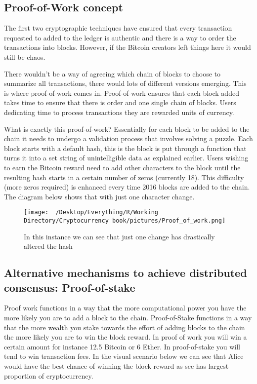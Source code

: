 \documentclass[]{book}
\theoremstyle{definition}
\theoremstyle{definition}
\theoremstyle{definition}
\theoremstyle{remark}
\begin{document}
\subsection{Proof-of-Work concept}\label{proof-of-work-concept}

The first two cryptographic techniques have ensured that every
transaction requested to added to the ledger is authentic and there is a
way to order the transactions into blocks. However, if the Bitcoin
creators left things here it would still be chaos.

There wouldn't be a way of agreeing which chain of blocks to choose to
summarize all transactions, there would lots of different versions
emerging. This is where proof-of-work comes in. Proof-of-work ensures
that each block added takes time to ensure that there is order and one
single chain of blocks. Users dedicating time to process transactions
they are rewarded units of currency.

What is exactly this proof-of-work? Essentially for each block to be
added to the chain it needs to undergo a validation process that
involves solving a puzzle. Each block starts with a default hash, this
is the block is put through a function that turns it into a set string
of unintelligible data as explained earlier. Users wishing to earn the
Bitcoin reward need to add other characters to the block until the
resulting hash starts in a certain number of zeros (currently 18). This
difficulty (more zeros required) is enhanced every time 2016 blocks are
added to the chain. The diagram below shows that with just one character
change.

\begin{figure}[htbp]
\centering
\texttt{[image: ~/Desktop/Everything/R/Working Directory/Cryptocurrency book/pictures/Proof\_of\_work.png]}
\caption{In this instance we can see that just one change has
drastically altered the hash}
\end{figure}

\subsection{Alternative mechanisms to achieve distributed consensus:
Proof-of-stake}\label{alternative-mechanisms-to-achieve-distributed-consensus-proof-of-stake}

Proof work functions in a way that the more computational power you have
the more likely you are to add a block to the chain. Proof-of-Stake
functions in a way that the more wealth you stake towards the effort of
adding blocks to the chain the more likely you are to win the block
reward. In proof of work you will win a certain amount for instance 12.5
Bitcoin or 6 Ether. In proof-of-stake you will tend to win transaction
fees. In the visual scenario below we can see that Alice would have the
best chance of winning the block reward as see has largest proportion of
cryptocurrency.
\end{document}
